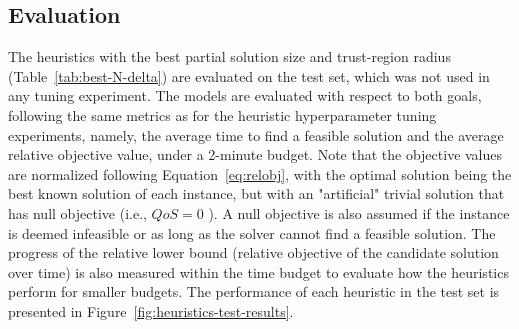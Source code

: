 \subsection{Evaluation}

The heuristics with the best partial solution size and trust-region radius (Table~\ref{tab:best-N-delta}) are evaluated on the test set, which was not used in any tuning experiment.
The models are evaluated with respect to both goals, following the same metrics as for the heuristic hyperparameter tuning experiments, namely, the average time to find a feasible solution and the average relative objective value, under a 2-minute budget.
Note that the objective values are normalized following Equation~\eqref{eq:relobj}, with the optimal solution being the best known solution of each instance, but with an "artificial" trivial solution that has null objective (i.e., $QoS=0$ ).
A null objective is also assumed if the instance is deemed infeasible or as long as the solver cannot find a feasible solution.
The progress of the relative lower bound (relative objective of the candidate solution over time) is also measured within the time budget to evaluate how the heuristics perform for smaller budgets.
The performance of each heuristic in the test set is presented in Figure~\ref{fig:heuristics-test-results}.

